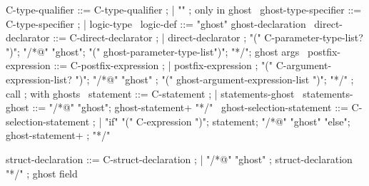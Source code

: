 \begin{syntax}

  C-type-qualifier ::= C-type-qualifier ;
  | "\ghost" ; only in ghost
  \
  ghost-type-specifier ::= C-type-specifier ;
  | {logic-type} \
  logic-def ::= "ghost" ghost-declaration \
  direct-declarator ::= C-direct-declarator ;
    | direct-declarator ;
    "(" C-parameter-type-list? ")";
        "/*@" "ghost";
          "(" ghost-parameter-type-list")";
          "*/"; ghost args
        \
  postfix-expression ::= C-postfix-expression ;
    | postfix-expression ;
     "(" C-argument-expression-list? ")";
     "/*@" "ghost" ;
       "(" ghost-argument-expression-list ")";
       "*/" ; call
              ; with ghosts
    \
  statement ::= C-statement ;
             | statements-ghost \
  statements-ghost ::= "/*@" "ghost";
                       ghost-statement+ "*/" \
  ghost-selection-statement ::= C-selection-statement ;
    | "if" "(" C-expression ")";
       statement;
      "/*@" "ghost" "else";
        ghost-statement+ ;
        "*/" \

  struct-declaration ::= C-struct-declaration ;
  | {"/*@" "ghost" };
    { struct-declaration "*/"} ; ghost field

\end{syntax}

